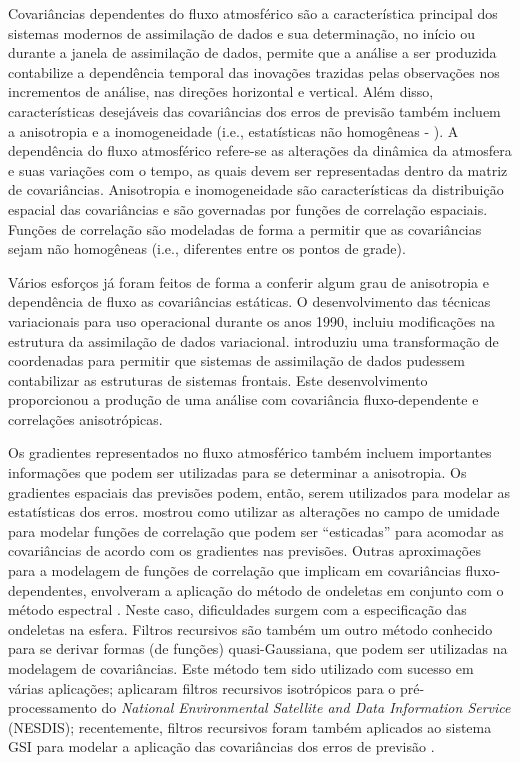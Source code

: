 Covariâncias dependentes do fluxo atmosférico são a característica principal dos sistemas modernos de assimilação de dados e sua determinação, no início ou durante a janela de assimilação de dados, permite que a análise a ser produzida contabilize a dependência temporal das inovações trazidas pelas observações nos incrementos de análise, nas direções horizontal e vertical. Além disso, características desejáveis das covariâncias dos erros de previsão também incluem a anisotropia e a inomogeneidade (i.e., estatísticas não homogêneas - ). A dependência do fluxo atmosférico refere-se as alterações da dinâmica da atmosfera e suas variações com o tempo, as quais devem ser representadas dentro da matriz de covariâncias. Anisotropia e inomogeneidade são características da distribuição espacial das covariâncias e são governadas por funções de correlação espaciais. Funções de correlação são modeladas de forma a permitir que as covariâncias sejam não homogêneas (i.e., diferentes entre os pontos de grade).

Vários esforços já foram feitos de forma a conferir algum grau de anisotropia e dependência de fluxo as covariâncias estáticas. O desenvolvimento das técnicas variacionais para uso operacional durante os anos 1990, incluiu modificações na estrutura da assimilação de dados variacional.  introduziu uma transformação de coordenadas para permitir que sistemas de assimilação de dados pudessem contabilizar as estruturas de sistemas frontais. Este desenvolvimento proporcionou a produção de uma análise com covariância fluxo-dependente e correlações anisotrópicas.

Os gradientes representados no fluxo atmosférico também incluem importantes informações que podem ser utilizadas para se determinar a anisotropia. Os gradientes espaciais das previsões podem, então, serem utilizados para modelar as estatísticas dos erros.  mostrou como utilizar as alterações no campo de umidade para modelar funções de correlação que podem ser ``esticadas'' para acomodar as covariâncias de acordo com os gradientes nas previsões. Outras aproximações para a modelagem de funções de correlação que implicam em covariâncias fluxo-dependentes, envolveram a aplicação do método de ondeletas em conjunto com o método espectral \cite{fisher/2003}. Neste caso, dificuldades surgem com a especificação das ondeletas na esfera. Filtros recursivos são também um outro método conhecido para se derivar formas (de funções) quasi-Gaussiana, que podem ser utilizadas na modelagem de covariâncias. Este método tem sido utilizado com sucesso em várias aplicações;  aplicaram filtros recursivos isotrópicos para o pré-processamento do \textit{National Environmental Satellite and Data Information Service} (NESDIS); recentemente, filtros recursivos foram também aplicados ao sistema GSI para modelar a aplicação das covariâncias dos erros de previsão \cite{wuetal/2002}.

